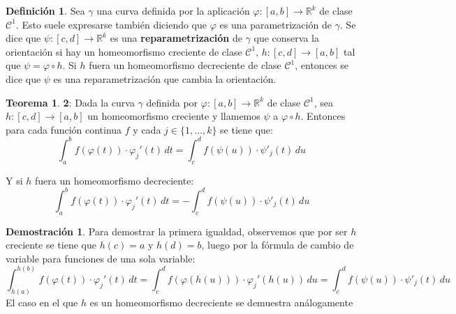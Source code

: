 \documentclass[12pt,twoside]{report}
\theoremstyle{azul}
\theoremstyle{azul2}
\theoremstyle{plain}
\theoremstyle{definition}
\newtheorem{defin}{Definición}[chapter]
\newtheorem*{dem}{Demostración}
\newtheorem*{theo}{Teorema}
\theoremstyle{remark}
\begin{document}
\begin{defin}
Sea $\gamma$ una curva definida por la aplicación $\varphi:[a,b]\longrightarrow \mathbb{R}^k$ de clase $\mathcal{C}^1$. Esto suele expresarse también diciendo que $\varphi$ es una parametrización de $\gamma$. Se dice que $\psi:[c,d]\longrightarrow \mathbb{R}^k$ es una \textbf{reparametrización} de $\gamma$ que conserva la orientación si hay un homeomorfismo creciente de clase $\mathcal{C}^1$, $h:[c,d]\longrightarrow[a,b]$ tal que $\psi=\varphi\circ h$. Si $h$ fuera un homeomorfismo decreciente de clase $\mathcal{C}^1$, entonces se dice que $\psi$ es una reparametrización que cambia la orientación.
\end{defin}
\begin{theo}
\textbf{2}: Dada la curva $\gamma$ definida por $\varphi:[a,b]\to \mathbb{R}^k$ de clase $\mathcal{C}^1$, sea $h:[c,d]\to[a,b]$ un homeomorfismo creciente y llamemos $\psi$ a $\varphi\circ h$. Entonces para cada función continua $f$ y cada $j\in\{1,\ldots,k\}$ se tiene que:
$$\int^b_a f(\varphi(t))\cdot \varphi_j'(t)\,dt=\int^d_c f(\psi(u))\cdot \psi'_j(t)\,du$$

Y si $h$ fuera un homeomorfismo decreciente:
$$\int^b_a f(\varphi(t))\cdot \varphi_j'(t)\,dt=-\int^d_c f(\psi(u))\cdot \psi'_j(t)\,du$$

\begin{dem}
Para demostrar la primera igualdad, observemos que por ser $h$ creciente se tiene que $h(c)=a$ y $h(d)=b$, luego por la fórmula de cambio de variable para funciones de una sola variable:
$$\int^{h(b)}_{h(a)} f(\varphi(t))\cdot \varphi_j'(t)\,dt=\int^d_c f(\varphi(h(u)))\cdot \varphi_j'(h(u))\,du=\int^d_c f(\psi(u))\cdot \psi'_j(t)\,du$$
El caso en el que $h$ es un homeomorfismo decreciente se demuestra análogamente
\end{dem}
\end{theo}
\end{document}
